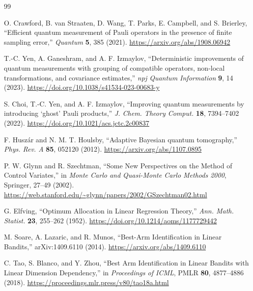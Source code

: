\documentclass[11pt]{article}
\begin{document}
\begin{thebibliography}{99}

O. Crawford, B. van Straaten, D. Wang, T. Parks, E. Campbell, and S. Brierley,
``Efficient quantum measurement of Pauli operators in the presence of finite sampling error,''
\emph{Quantum} \textbf{5}, 385 (2021).
\url{https://arxiv.org/abs/1908.06942}

T.-C. Yen, A. Ganeshram, and A. F. Izmaylov,
``Deterministic improvements of quantum measurements with grouping of compatible operators, non-local transformations, and covariance estimates,''
\emph{npj Quantum Information} \textbf{9}, 14 (2023).
\url{https://doi.org/10.1038/s41534-023-00683-y}

S. Choi, T.-C. Yen, and A. F. Izmaylov,
``Improving quantum measurements by introducing `ghost' Pauli products,''
\emph{J. Chem. Theory Comput.} \textbf{18}, 7394--7402 (2022).
\url{https://doi.org/10.1021/acs.jctc.2c00837}

F. Husz\'ar and N. M. T. Houlsby,
``Adaptive Bayesian quantum tomography,''
\emph{Phys. Rev. A} \textbf{85}, 052120 (2012).
\url{https://arxiv.org/abs/1107.0895}

P. W. Glynn and R. Szechtman,
``Some New Perspectives on the Method of Control Variates,''
in \emph{Monte Carlo and Quasi-Monte Carlo Methods 2000}, Springer, 27--49 (2002).
\url{https://web.stanford.edu/~glynn/papers/2002/GSzechtman02.html}

G. Elfving,
``Optimum Allocation in Linear Regression Theory,''
\emph{Ann. Math. Statist.} \textbf{23}, 255--262 (1952).
\url{https://doi.org/10.1214/aoms/1177729442}

M. Soare, A. Lazaric, and R. Munos,
``Best-Arm Identification in Linear Bandits,''
arXiv:1409.6110 (2014).
\url{https://arxiv.org/abs/1409.6110}

C. Tao, S. Blanco, and Y. Zhou,
``Best Arm Identification in Linear Bandits with Linear Dimension Dependency,''
in \emph{Proceedings of ICML}, PMLR \textbf{80}, 4877--4886 (2018).
\url{https://proceedings.mlr.press/v80/tao18a.html}

\end{thebibliography}
\end{document}
